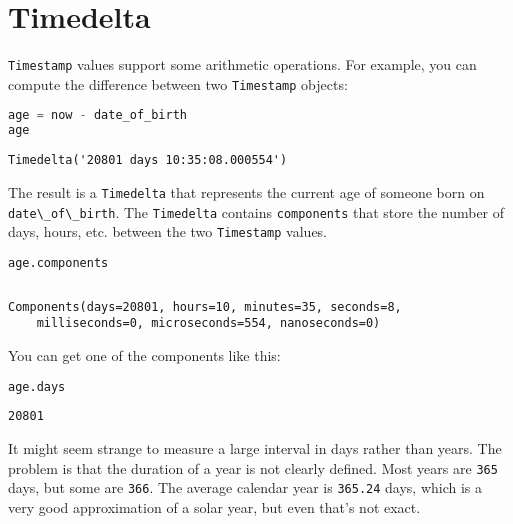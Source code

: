 \hypertarget{timedelta}{%
\section{Timedelta}\label{timedelta}}

\passthrough{\lstinline!Timestamp!} values support some arithmetic
operations. For example, you can compute the difference between two
\passthrough{\lstinline!Timestamp!} objects:

\begin{lstlisting}[language=Python,style=source]
age = now - date_of_birth
age
\end{lstlisting}

\begin{lstlisting}[style=output]
Timedelta('20801 days 10:35:08.000554')
\end{lstlisting}

The result is a \passthrough{\lstinline!Timedelta!} that represents the
current age of someone born on
\passthrough{\lstinline!date\_of\_birth!}. The
\passthrough{\lstinline!Timedelta!} contains
\passthrough{\lstinline!components!} that store the number of days,
hours, etc. between the two \passthrough{\lstinline!Timestamp!} values.

\begin{lstlisting}[language=Python,style=source]
age.components
\end{lstlisting}

\begin{lstlisting}[language=Python,style=source]
\end{lstlisting}

\begin{lstlisting}[style=output]
Components(days=20801, hours=10, minutes=35, seconds=8,
    milliseconds=0, microseconds=554, nanoseconds=0)
\end{lstlisting}

You can get one of the components like this:

\begin{lstlisting}[language=Python,style=source]
age.days
\end{lstlisting}

\begin{lstlisting}[style=output]
20801
\end{lstlisting}

It might seem strange to measure a large interval in days rather than
years. The problem is that the duration of a year is not clearly
defined. Most years are \passthrough{\lstinline!365!} days, but some are
\passthrough{\lstinline!366!}. The average calendar year is
\passthrough{\lstinline!365.24!} days, which is a very good
approximation of a solar year, but even that's not exact.

